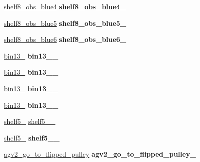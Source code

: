 \begin{DoxyCompactItemize}
\item 
\mbox{\label{classGantryControl_a173c289632b1b2ffb6856c5af3316abe}} 
\hyperlink{structPresetLocation}{shelf8\+\_\+obs\+\_\+blue4} {\bfseries shelf8\+\_\+obs\+\_\+blue4\+\_\+}
\item 
\mbox{\label{classGantryControl_a4fe3efe60792fb2811ef35d100e17584}} 
\hyperlink{structPresetLocation}{shelf8\+\_\+obs\+\_\+blue5} {\bfseries shelf8\+\_\+obs\+\_\+blue5\+\_\+}
\item 
\mbox{\label{classGantryControl_a11498849015ddef8d30b116ae3162f66}} 
\hyperlink{structPresetLocation}{shelf8\+\_\+obs\+\_\+blue6} {\bfseries shelf8\+\_\+obs\+\_\+blue6\+\_\+}
\item 
\mbox{\label{classGantryControl_adad0434f9704f9f4d8cdae7d356b7ede}} 
\hyperlink{structPresetLocation}{bin13\+\_} {\bfseries bin13\+\_\+\_\+}
\item 
\mbox{\label{classGantryControl_ac3ea0f1a8231a9adb00b4947312ed617}} 
\hyperlink{structPresetLocation}{bin13\+\_} {\bfseries bin13\+\_\+\_\+}
\item 
\mbox{\label{classGantryControl_a0ceaa21c6825042a7567d9557af09b6c}} 
\hyperlink{structPresetLocation}{bin13\+\_} {\bfseries bin13\+\_\+\_\+}
\item 
\mbox{\label{classGantryControl_ad873b7f342813a2b72ca828f477d0682}} 
\hyperlink{structPresetLocation}{bin13\+\_} {\bfseries bin13\+\_\+\_\+}
\item 
\hyperlink{structPresetLocation}{shelf5\+\_} \hyperlink{classGantryControl_a6ff39df843c8d886e0dcc084414c8038}{shelf5\+\_\+\_\+}
\item 
\mbox{\label{classGantryControl_a3c725053cfb5aae7bfa14111a1b50a24}} 
\hyperlink{structPresetLocation}{shelf5\+\_} {\bfseries shelf5\+\_\+\_\+}
\item 
\mbox{\label{classGantryControl_adc3cc30ac98c2e214748b6b59992b7cb}} 
\hyperlink{structPresetLocation}{agv2\+\_\+go\+\_\+to\+\_\+flipped\+\_\+pulley} {\bfseries agv2\+\_\+go\+\_\+to\+\_\+flipped\+\_\+pulley\+\_\+}

\end{DoxyCompactItemize}
